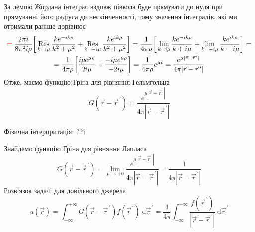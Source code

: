 За лемою Жордана інтеграл вздовж півкола буде прямувати до нуля при прямуванні його радіуса до нескінченності, тому значення інтегралів, які ми отримали раніше дорівнює 
\begin{equation*}
    \begin{gathered}
        \textcolor{red}{=} \; \frac{2\pi i}{8\pi^2i\rho} \bigg[ \mathop{\mathrm{Res}}_{k = i\mu} \frac{ke^{-ik\rho}}{k^2 + \mu^2} + \mathop{\mathrm{Res}}_{k = -i\mu} \frac{ke^{ik\rho}}{k^2 + \mu^2} \bigg] = \frac{1}{4\pi \rho} \bigg[ \lim_{k = i\mu} \frac{ke^{-ik\rho}}{k + i\mu} + \lim_{k = -i\mu} \frac{ke^{ik\rho}}{k - i\mu} \bigg] =\\
        = \frac{1}{4\pi \rho} \bigg[ \frac{i\mu e^{\mu\rho}}{2i\mu} + \frac{-i\mu e^{\mu\rho}}{-2i\mu} \bigg] = \frac{1}{4\pi\rho} e^{\mu\rho} = \frac{e^{\mu|\vec{r} - \vec{r}^{\,\prime}|}}{4\pi |\vec{r} - \vec{r}^{\,\prime}|}
    \end{gathered}
\end{equation*}  
Отже, маємо функцію Гріна для рівняння Гельмгольца
\begin{equation}
    G(\vec{r} - \vec{r}^{\,\prime}) = \frac{e^{\mu|\vec{r} - \vec{r}^{\,\prime}|}}{4\pi |\vec{r} - \vec{r}^{\,\prime}|}
\end{equation} 

Фізична інтерпритація: ???

Знайдемо функцію Гріна для рівняння Лапласа
\begin{equation}
    G(\vec{r} - \vec{r}^{\,\prime}) = \lim_{\mu \to +0} \frac{e^{\mu|\vec{r} - \vec{r}^{\,\prime}|}}{4\pi |\vec{r} - \vec{r}^{\,\prime}|} = \frac{1}{4\pi |\vec{r} - \vec{r}^{\,\prime}|}
\end{equation} 
Розв'язок задачі для довільного джерела
\begin{equation}
    u(\vec{r}) = \int_{-\infty}^{+\infty} G(\vec{r} - \vec{r}^{\,\prime}) f(\vec{r}^{\,\prime}) \; \mathrm{d}\vec{r}^{\,\prime} = \frac{1}{4\pi} \int_{-\infty}^{+\infty} \frac{f(\vec{r}^{\,\prime})}{|\vec{r} - \vec{r}^{\,\prime}|} \; \mathrm{d}\vec{r}^{\,\prime}
\end{equation}

%